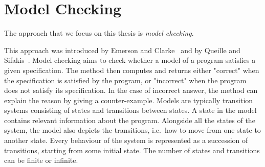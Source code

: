 \chapter{Model Checking}
\label{section:model:checking}
%
%
%

The approach that we focus on this thesis is
\emph{model checking}.
%
%

This approach was introduced by Emerson and Clarke~\cite{CE82} and by Queille and Sifakis~\cite{QS82}. 
Model checking aims to check whether a model of a program satisfies a given specification.
 The method then computes and returns either "correct" when the specification is satisfied by the program, or "incorrect" when the program does not satisfy its specification. In the case of incorrect answer, the method can explain the reason by giving a counter-example.
Models are typically transition systems consisting of states and transitions between states.
A state in the model contains relevant information about the program.
Alongside all the states of the system, the model also depicts the
transitions, i.e.\ how to move from one state to another state. Every behaviour of the system is represented as a succession of transitions, starting from some initial state.
The number of states and transitions can be finite or infinite.
